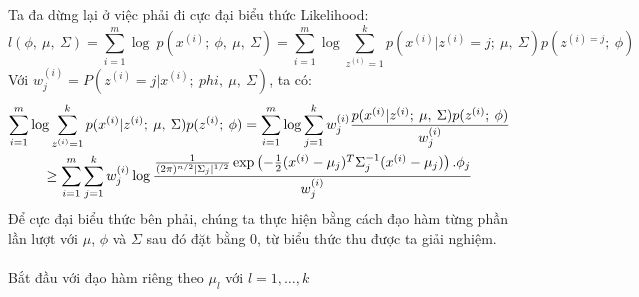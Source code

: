 Ta đa dừng lại ở việc phải đi cực đại biểu thức Likelihood:
\[ l(\phi,\:\mu,\:\Sigma) = \sum_{i=1}^{m} \log\:
p(x^{(i)};\:\phi,\:\mu,\:\Sigma) = \sum_{i=1}^{m} \log \sum_{z^{(i)}=1}^{k}
p(x^{(i)}|z^{(i)}=j;\:\mu,\:\Sigma)p(z^{(i)=j};\:\phi) \]
Với $w_{j}^{(i)} = P(z^{(i)}=j|x^{(i)};\:phi,\:\mu,\:\Sigma)$, ta có:
\begin{multline}
\sum_{i=1}^{m} \log \sum_{z^{(i)}=1}^{k}
p(x^{(i)}|z^{(i)};\:\mu,\:\Sigma)p(z^{(i)};\:\phi) = \sum_{i=1}^{m} \log
\sum_{j=1}^{k}
w_{j}^{(i)}\frac{p(x^{(i)}|z^{(i)};\:\mu,\:\Sigma)p(z^{(i)};\:\phi)}{w_{j}^{(i)}}\\
\geq \sum_{i=1}^{m} \sum_{j=1}^{k} w_{j}^{(i)} \log
\frac{\frac{1}{(2\pi)^{n/2}|\Sigma_j|^{1/2}}\exp\left( -\frac{1}{2}
(x^{(i)}-\mu_j)^T \Sigma_j^{-1} (x^{(i)}-\mu_j)
\right).\phi_j}{w_{j}^{(i)}}\notag
\end{multline}
Để cực đại biểu thức bên phải, chúng ta thực hiện bằng cách đạo hàm từng phần
lần lượt với $\mu$, $\phi$ và $\Sigma$ sau đó đặt bằng 0, từ biểu thức thu được
ta giải nghiệm.\\\\ 
Bắt đầu với đạo hàm riêng theo $\mu_l$ với $l=1,\dots, k$
